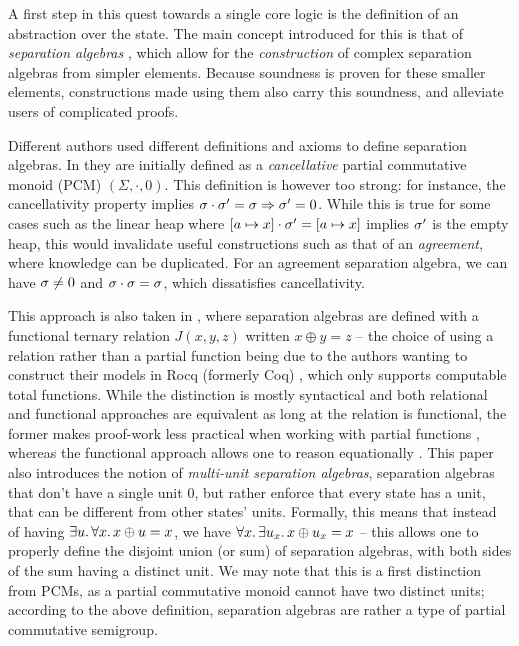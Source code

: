 A first step in this quest towards a single core logic is the definition of an abstraction over the state. The main concept introduced for this is that of \emph{separation algebras} \cite{abstractseplogic, sepalgebra}, which allow for the \emph{construction} of complex separation algebras from simpler elements. Because soundness is proven for these smaller elements, constructions made using them also carry this soundness, and alleviate users of complicated proofs.

Different authors used different definitions and axioms to define separation algebras. In \cite{abstractseplogic} they are initially defined as a \emph{cancellative} partial commutative monoid (PCM) $(\Sigma, \cdot, 0)$. This definition is however too strong: for instance, the cancellativity property implies $\sigma\cdot\sigma'=\sigma \Rightarrow \sigma'=0$. While this is true for some cases such as the linear heap where $[a\mapsto x]\cdot \sigma'=[a\mapsto x]$ implies $\sigma'$ is the empty heap, this would invalidate useful constructions such as that of an \emph{agreement}, where knowledge can be duplicated. For an agreement separation algebra, we can have $\sigma\neq 0$ and $\sigma \cdot \sigma = \sigma$, which dissatisfies cancellativity.

This approach is also taken in \cite{sepalgebra}, where separation algebras are defined with a functional ternary relation $J(x,y,z)$ written $x\oplus y=z$ -- the choice of using a relation rather than a partial function being due to the authors wanting to construct their models in Rocq (formerly Coq) \cite{coq}, which only supports computable total functions. While the distinction is mostly syntactical and both relational and functional approaches are equivalent as long at the relation is functional, the former makes proof-work less practical when working with partial functions \cite{statesoundness}, whereas the functional approach allows one to reason equationally \cite{iris}. This paper also introduces the notion of \emph{multi-unit separation algebras}, separation algebras that don't have a single unit $0$, but rather enforce that every state has a unit, that can be different from other states' units. Formally, this means that instead of having $\exists u\ldotp \forall x\ldotp x \oplus u = x$, we have $\forall x\ldotp\exists u_x\ldotp x\oplus u_x=x$ -- this allows one to properly define the disjoint union (or sum) of separation algebras, with both sides of the sum having a distinct unit. We may note that this is a first distinction from PCMs, as a partial commutative monoid cannot have two distinct units; according to the above definition, separation algebras are rather a type of partial commutative semigroup.

